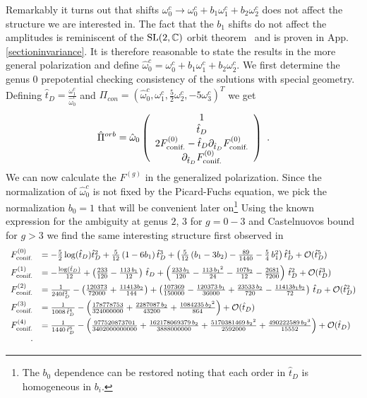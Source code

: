 \documentclass[12pt]{article}
\begin{document}
Remarkably it turns out that  
shifts $\omega_0^c\rightarrow \omega_0^c+b_1\omega_1^c+b_2\omega_2^c$ 
does not affect the structure we are interested in. The fact that the 
$b_1$ shifts do not affect the amplitudes is reminiscent of the ${\rm
SL}(2,\mathbb{C})$ orbit theorem~\cite{Schmidt,CKS} and is proven
in App. \ref{sectioninvariance}. It is therefore reasonable to 
state the results in the more general polarization and define $\hat \omega^c_0= \omega^c_0 
+ b_1 \omega^c_1 + b_2 \omega^c_2$. We first determine the genus
$0$ prepotential checking consistency of the solutions with special 
geometry. Defining $\hat t_D=\frac{\omega_1^c}{\hat \omega_0^c}$ and 
$\Pi_{con}=(\hat \omega^c_0,\omega^c_1,\frac{5}{2}\omega^c_2,-5\omega^c_3)^T$ we get
\begin{equation}
\hat \Pi^{orb}=\hat \omega_0 \left(\begin{array}{c}
1\cr
\hat t_D\cr
2 F_{\textrm{conif.}}^{(0)}- \hat t_D \partial_{\hat t_D} 
F_{\textrm{conif.}}^{(0)}\cr
\partial_{\hat t_D} F_{\textrm{conif.}}^{(0)}
\end{array}
\right)\ .
\end{equation}
We can now calculate the $F^{(g)}$ in the generalized polarization. Since the normalization of
$\hat \omega_0^c$ is not fixed by the Picard-Fuchs equation, we 
pick the  normalization $b_0=1$ that will be convenient later on\footnote{The $b_0$ dependence can be restored noting
that each order in $\hat t_D$ is homogeneous in $b_i$.} Using the known expression for the ambiguity 
at genus $2$, $3$ \cite{BCOV, Katz:1999,Yamaguchi} for $g=0-3$ and Castelnuovos bound for $g>3$ we 
find the same interesting structure first observed in \cite{Huang}
\begin{equation} 
\begin{array}{rl} 
F_{\textrm{conif.}}^{(0)}&=-\frac{5}{2} \log (\hat t_D) \hat t_D^2 +\frac{5}{12}\left( 1 - 6b_1 \right)\hat t^3_D + 
  \left(\frac{5}{12} \left( b_1 - 3 b_2 \right)  -\frac{89}{1440}  - 
\frac{5}{4}\,b_1^2\right) \hat t_D^4 + {\cal O}(\hat t_D^5)\\ [2 mm]
F_{\textrm{conif.}}^{(1)}&=-\frac{\log (\hat t_D)}{12} + \left( \frac{233}{120} - \frac{113\,b_1}{12} \right) \,\hat t_D + 
  \left(\frac{233\,b_1}{120} - \frac{113\,{b_1}^2}{24} - 
     \frac{107 b_2}{12} -\frac{2681}{7200}\right) \,{\hat t_D}^2 + {{\cal O}(\hat t_D^3)}\\[2 mm]
F_{\textrm{conif.}}^{(2)}&=\frac{1}{240 {\hat t_D}^2} - \left(\frac{120373}{72000}   + \frac{11413 b_2}{144}\right) + 
  \left( \frac{107369}{150000} - \frac{120373\,b_1}{36000} + \frac{23533\,b_2}{720} - 
     \frac{11413 b_1 b_2}{72} \right) \,\hat t_D + {{\cal O}(\hat t_D^2)}\\ [2 mm] 
F_{\textrm{conif.}}^{(3)}&=\frac{1}{1008\,{\hat t_D}^4} - \left(
   \frac{178778753}{324000000}   + \frac{2287087\,b_2}{43200} + 
    \frac{1084235\,{b_2}^2}{864}\right) + {\cal O}(\hat t_D)\\[2 mm]
F_{\textrm{conif.}}^{(4)}&=\frac{1}{1440\,{\hat t_D}^6} - \left( \frac{977520873701}{3402000000000}   
+ \frac{162178069379\,b_2}{3888000000} + 
    \frac{5170381469\,{b_2}^2}{2592000} + \frac{490222589\,{b_2}^3}{15552}\right) + 
  {\cal O}(\hat t_D) \cr.
\end{array}
\end{equation}
\end{document}
